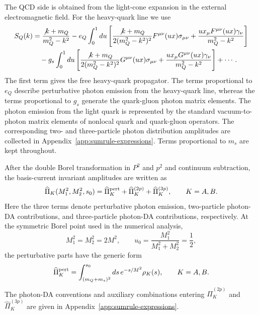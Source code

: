 \documentclass[aps,prd,preprint,nofootinbib,superscriptaddress]{revtex4-2}
\begin{document}
The QCD side is obtained from the light-cone expansion in the external
electromagnetic field.  For the heavy-quark line we use
\begin{align}
  S_Q(k) &=
  \frac{\not k+m_Q}{m_Q^2-k^2}
  -e_Q\int_0^1du
  \left[
  \frac{\not k+m_Q}{2(m_Q^2-k^2)^2}
  F^{\mu\nu}(ux)\sigma_{\mu\nu}
  +\frac{u x_\mu F^{\mu\nu}(ux)\gamma_\nu}{m_Q^2-k^2}
  \right]
  \notag\\
  &\quad
  -g_s\int_0^1du
  \left[
  \frac{\not k+m_Q}{2(m_Q^2-k^2)^2}
  G^{\mu\nu}(ux)\sigma_{\mu\nu}
  +\frac{u x_\mu G^{\mu\nu}(ux)\gamma_\nu}{m_Q^2-k^2}
  \right]
  +\cdots .
  \label{eq:heavy-prop}
\end{align}
The first term gives the free heavy-quark propagator.  The terms proportional
to \(e_Q\) describe perturbative photon emission from the heavy-quark line,
whereas the terms proportional to \(g_s\) generate the quark-gluon photon
matrix elements.  The photon emission from the light quark is represented by
the standard vacuum-to-photon matrix elements of nonlocal quark and
quark-gluon operators.  The corresponding two- and three-particle photon
distribution amplitudes are collected in Appendix~\ref{app:sumrule-expressions}.
Terms proportional to \(m_s\) are kept throughout.

After the double Borel transformation in \(P^2\) and \(p^2\) and continuum
subtraction, the basis-current invariant amplitudes are written as
\begin{equation}
  \widehat\Pi_K(M_1^2,M_2^2,s_0)
  =
  \widehat\Pi_K^{\rm pert}
  +\widehat\Pi_K^{(2p)}
  +\widehat\Pi_K^{(3p)},
  \qquad K=A,B .
  \label{eq:pi-decomp}
\end{equation}
Here the three terms denote perturbative photon emission, two-particle
photon-DA contributions, and three-particle photon-DA contributions,
respectively.  At the symmetric Borel point used in the numerical analysis,
\begin{equation}
  M_1^2=M_2^2=2M^2,
  \qquad
  u_0=\frac{M_1^2}{M_1^2+M_2^2}=\frac12 ,
  \label{eq:borel-defs}
\end{equation}
the perturbative parts have the generic form
\begin{equation}
  \widehat\Pi_K^{\rm pert}
  =
  \int_{(m_Q+m_s)^2}^{s_0}ds\,e^{-s/M^2}\rho_K(s),
  \qquad K=A,B .
  \label{eq:pert-part}
\end{equation}
The photon-DA conventions and auxiliary combinations entering
\(\widehat\Pi_K^{(2p)}\) and \(\widehat\Pi_K^{(3p)}\) are given in
Appendix~\ref{app:sumrule-expressions}.
\end{document}
